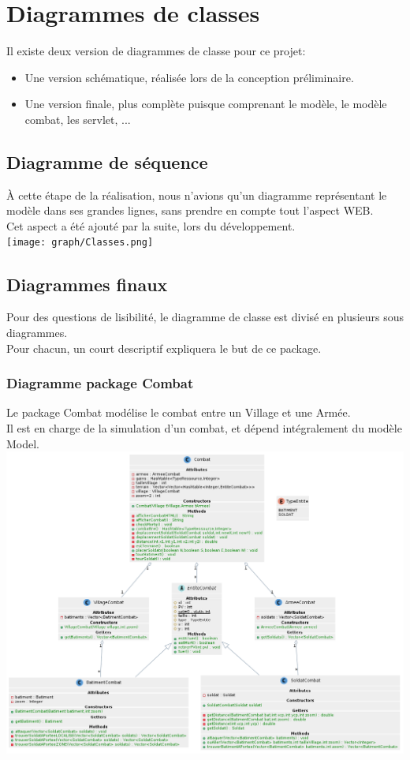 \chapter{Diagrammes de classes}
    Il existe deux version de diagrammes de classe pour ce projet:
    \begin{itemize}
        \item Une version schématique, réalisée lors de la conception préliminaire.
        \item Une version finale, plus complète puisque comprenant le modèle, le modèle combat, les servlet, ...
    \end{itemize}
    \section{Diagramme de séquence}
        À cette étape de la réalisation, nous n'avions qu'un diagramme représentant le modèle dans ses grandes lignes, sans prendre en compte tout l'aspect WEB.\\
        Cet aspect a été ajouté par la suite, lors du développement.\\

        \texttt{[image: graph/Classes.png]}
    \section{Diagrammes finaux}
        Pour des questions de lisibilité, le diagramme de classe est divisé en plusieurs sous diagrammes.\\
        Pour chacun, un court descriptif expliquera le but de ce package.
        \subsection{Diagramme package Combat}
            Le package Combat modélise le combat entre un Village et une Armée.\\
            Il est en charge de la simulation d'un combat, et dépend intégralement du modèle Model.\\

            \includegraphics[scale=0.4]{ressources/images/ClassesCombat.png}
